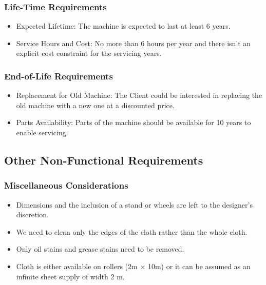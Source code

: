 \documentclass[table,french,english]{rapportCS}
\begin{document}
  \subsubsection{Life-Time Requirements}\label{sec: lifetimereq}
    \begin{itemize}[label=$\bullet$]
      \item Expected Lifetime: The machine is expected to last at least 6 years.
      \item Service Hours and Cost: No more than 6 hours per year and there isn’t an explicit cost constraint for the servicing years.
    \end{itemize}
  \subsubsection{End-of-Life Requirements}\label{sec: endoflifereq}
    \begin{itemize}[label=$\bullet$]
      \item Replacement for Old Machine: The Client could be interested in replacing the old machine with a new one at a discounted price.
      \item Parts Availability: Parts of the machine should be available for 10 years to enable servicing.
    \end{itemize}

\subsection{Other Non-Functional Requirements}\label{sec:otherreq}
\subsubsection{Miscellaneous Considerations}\label{sec:misccons}
    \begin{itemize}[label=$\bullet$]
      \item Dimensions and the inclusion of a stand or wheels are left to the designer's discretion.
      \item We need to clean only the edges of the cloth rather than the whole cloth.
      \item Only oil stains and grease stains need to be removed.
      \item Cloth is either available on rollers (2m $\times$ 10m) or it can be assumed as an infinite sheet supply of width 2 m.

    \end{itemize}
\newpage
\end{document}
